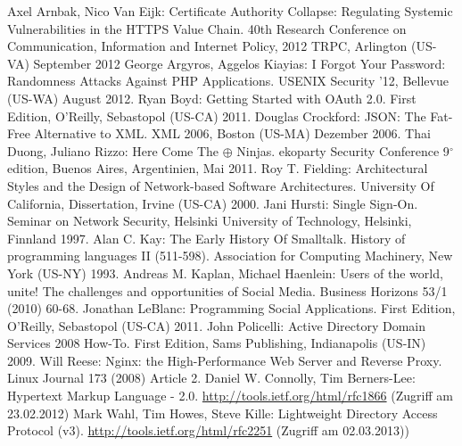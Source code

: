 \documentclass[12pt,a4paper,pointednumbers,abstracton]{scrartcl}
\begin{document}
\newpage
{}
\begin{raggedright}%
\begin{thebibliography}{XXXXXXXX}
     Axel Arnbak, Nico Van Eijk: Certificate Authority Collapse: Regulating Systemic Vulnerabilities in the HTTPS Value Chain. 40th Research Conference on Communication, Information and Internet Policy, 2012 TRPC, Arlington (US-VA) September 2012
     George Argyros, Aggelos Kiayias: I Forgot Your Password: Randomness Attacks Against PHP Applications. USENIX Security '12, Bellevue (US-WA) August 2012.
	 Ryan Boyd: Getting Started with OAuth 2.0. First Edition, O'Reilly, Sebastopol (US-CA) 2011.
	 Douglas Crockford: JSON: The Fat-Free Alternative to XML. XML 2006, Boston (US-MA) Dezember 2006.
	 Thai Duong, Juliano Rizzo: Here Come The $\oplus$ Ninjas. ekoparty Security Conference 9$^\circ$ edition, Buenos Aires, Argentinien, Mai 2011.
	 Roy T. Fielding: Architectural Styles and the Design of Network-based Software Architectures. University Of California, Dissertation, Irvine (US-CA) 2000.
	 Jani Hursti: Single Sign-On. Seminar on Network Security, Helsinki University of Technology, Helsinki, Finnland 1997.
	 Alan C. Kay: The Early History Of Smalltalk. History of programming languages II (511-598). Association for Computing Machinery, New York (US-NY) 1993.
	 Andreas M. Kaplan, Michael Haenlein: Users of the world, unite! The challenges and opportunities of Social Media. Business Horizons 53/1 (2010) 60-68.
	 Jonathan LeBlanc: Programming Social Applications. First Edition, O'Reilly, Sebastopol (US-CA) 2011.
	 John Policelli: Active Directory Domain Services 2008 How-To. First Edition, Sams Publishing, Indianapolis (US-IN) 2009.
	 Will Reese:  Nginx: the High-Performance Web Server and Reverse Proxy. Linux Journal 173 (2008) Article 2.
	 Daniel W. Connolly, Tim Berners-Lee: Hypertext Markup Language - 2.0. \url{http://tools.ietf.org/html/rfc1866} (Zugriff am 23.02.2012)
	 Mark Wahl, Tim Howes, Steve Kille: Lightweight Directory Access Protocol (v3). \url{http://tools.ietf.org/html/rfc2251} (Zugriff am 02.03.2013))

\end{thebibliography}
\end{raggedright}
\end{document}
